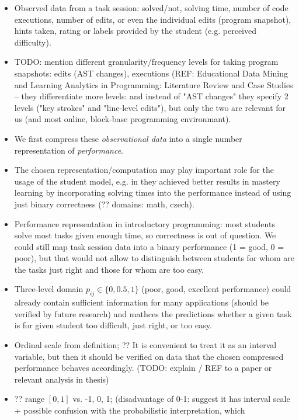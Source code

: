 \begin{itemize}
\item Observed data from a task session:
  solved/not, solving time, number of code executions, number of edits,
  or even the individual edits (program snapshot), hints taken,
  rating or labels provided by the student (e.g. perceived difficulty).
\item TODO: mention different granularity/frequency levels for taking program
  snapshots: edits (AST changes), executions
  (REF: Educational Data Mining and Learning Analytics in Programming:
  Literature Review and Case Studies -- they differentiate more levels:
  and instead of "AST changes" they specify 2 levels ("key strokes" and
  "line-level edits"), but only the two are relevant for us (and most online,
  block-base programming environmant).
\item We first compress these \emph{observational data} into a
  single number representation of \emph{performance}.
\item The chosen representation/computation may play important role for the usage
  of the student model, e.g. in \cite{alg.mastery} they achieved better results
  in mastery learning by incorporating solving times into the performance instead
  of using just binary correctness (?? domains: math, czech).
\item Performance representation in introductory programming:
  most students solve most tasks given enough time, so correctness is out of
  question. We could still map task session data into a binary performance (1
  = good, 0 = poor), but that would not allow to distinguish between students
  for whom are the tasks just right and those for whom are too easy.
\item Three-level domain $p_{ij} \in \{0, 0.5, 1\}$ (poor, good, excellent performance)
  could already contain sufficient information for many applications
  (should be verified by future research)
  and mathces the predictions whether a given task is for given student too
  difficult, just right, or too easy.
\item Ordinal scale from definition;
  ??  It is convenient to treat it as an interval variable,
  but then it should be verified on data that the chosen compressed performance
  behaves accordingly. (TODO: explain / REF to a paper or relevant analysis in
  thesis)
\item ?? range $[0, 1]$ vs. -1, 0, 1; (disadvantage of 0-1: suggest it has interval
  scale + possible confusion with the probabilistic interpretation, which

\end{itemize}
